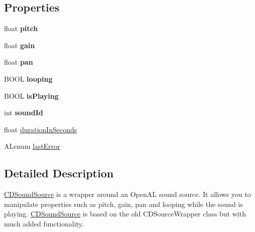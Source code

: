 \subsection*{Properties}
\begin{DoxyCompactItemize}
\item 
\hypertarget{interface_c_d_sound_source_aa18363948940c0813dc99c21c3026fbd}{float {\bfseries pitch}}\label{interface_c_d_sound_source_aa18363948940c0813dc99c21c3026fbd}

\item 
\hypertarget{interface_c_d_sound_source_ad6af000c5bc05853db4d9aa39c7a4c21}{float {\bfseries gain}}\label{interface_c_d_sound_source_ad6af000c5bc05853db4d9aa39c7a4c21}

\item 
\hypertarget{interface_c_d_sound_source_a284dc619da74f09a9fe9e39f198d626b}{float {\bfseries pan}}\label{interface_c_d_sound_source_a284dc619da74f09a9fe9e39f198d626b}

\item 
\hypertarget{interface_c_d_sound_source_a926cf544f910e23e59f71181272f6e4d}{B\-O\-O\-L {\bfseries looping}}\label{interface_c_d_sound_source_a926cf544f910e23e59f71181272f6e4d}

\item 
\hypertarget{interface_c_d_sound_source_abe7973e6b487094cedd5b5fac920cef2}{B\-O\-O\-L {\bfseries is\-Playing}}\label{interface_c_d_sound_source_abe7973e6b487094cedd5b5fac920cef2}

\item 
\hypertarget{interface_c_d_sound_source_a226e9a094bafd48393e81d0c44a9a07a}{int {\bfseries sound\-Id}}\label{interface_c_d_sound_source_a226e9a094bafd48393e81d0c44a9a07a}

\item 
float \hyperlink{interface_c_d_sound_source_a403933986316e6c2ecc5d7357cece956}{duration\-In\-Seconds}
\item 
A\-Lenum \hyperlink{interface_c_d_sound_source_aca348013aabdd95a2bb6aa837c7f74e9}{last\-Error}
\end{DoxyCompactItemize}


\subsection{Detailed Description}
\hyperlink{interface_c_d_sound_source}{C\-D\-Sound\-Source} is a wrapper around an Open\-A\-L sound source. It allows you to manipulate properties such as pitch, gain, pan and looping while the sound is playing. \hyperlink{interface_c_d_sound_source}{C\-D\-Sound\-Source} is based on the old C\-D\-Source\-Wrapper class but with much added functionality.

